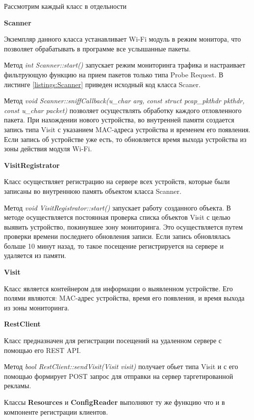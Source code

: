 Рассмотрим каждый класс в отдельности

\textbf{Scanner}

Экземпляр данного класса устанавливает Wi-Fi модуль в режим монитора, что позволяет обрабатывать в программе все услышанные пакеты.

Метод \textit{int Scanner::start()} запускает режим мониторинга трафика и настраивает фильтрующую функцию на прием пакетов только типа Probe Request. В листинге \ref{listings:Scanner} приведен исходный код класса Scaner.

Метод \textit{void Scanner::sniffCallback(u\_char \*arg, const struct pcap\_pkthdr \*pkthdr, const u\_char \*packet)} позволяет осуществлять обработку каждого отловленного пакета. При нахождении нового устройства, во внутренней памяти создается запись типа Visit с указанием MAC-адреса устройства и временем его появления. Если запись об устройстве уже есть, то обновляется время выхода устройства из зоны действия модуля Wi-Fi.

\textbf{VisitRegistrator}

Класс осуществляет регистрацию на сервере всех устройств, которые были записаны во внутреннюю память объектом класса Scanner.

Метод \textit{void VisitRegistrator::start()} запускает работу созданного объекта. В методе осуществляется постоянная проверка списка объектов Visit с целью выявить устройство, покинувшее зону мониторинга. Это осуществляется путем проверки времени последнего обновления записи. Если запись обновлялась больше 10 минут назад, то такое посещение регистрируется на сервере и удаляется из памяти.

\textbf{Visit}

Класс является контейнером для информации о выявленном устройстве. Его полями являются: MAC-адрес устройства, время его появления, и время выхода из зоны мониторинга.

\textbf{RestClient}

Класс предназначен для регистрации посещений на удаленном сервере с помощью его REST API. 

Метод \textit{bool RestClient::sendVisit(Visit visit)} получает обьет типа Visit и с его помощью формирует POST запрос для отправки на сервер таргетированной рекламы.

Классы \textbf{Resources} и \textbf{ConfigReader} выполняют ту же функцию что и в компоненте регистрации клиентов.

